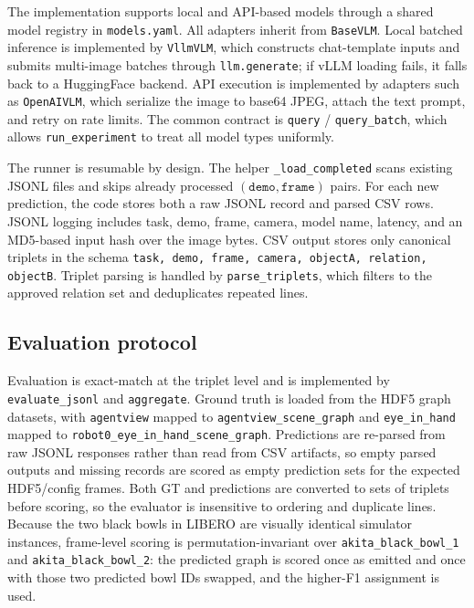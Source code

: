 \documentclass{article}
\begin{document}
The implementation supports local and API-based models through a shared model registry in \texttt{models.yaml}. All adapters inherit from \texttt{BaseVLM}. Local batched inference is implemented by \texttt{VllmVLM}, which constructs chat-template inputs and submits multi-image batches through \texttt{llm.generate}; if vLLM loading fails, it falls back to a HuggingFace backend. API execution is implemented by adapters such as \texttt{OpenAIVLM}, which serialize the image to base64 JPEG, attach the text prompt, and retry on rate limits. The common contract is \texttt{query} / \texttt{query\_batch}, which allows \texttt{run\_experiment} to treat all model types uniformly.

The runner is resumable by design. The helper \texttt{\_load\_completed} scans existing JSONL files and skips already processed $(\texttt{demo}, \texttt{frame})$ pairs. For each new prediction, the code stores both a raw JSONL record and parsed CSV rows. JSONL logging includes task, demo, frame, camera, model name, latency, and an MD5-based input hash over the image bytes. CSV output stores only canonical triplets in the schema \texttt{task, demo, frame, camera, objectA, relation, objectB}. Triplet parsing is handled by \texttt{parse\_triplets}, which filters to the approved relation set and deduplicates repeated lines.

\subsection{Evaluation protocol}
Evaluation is exact-match at the triplet level and is implemented by \texttt{evaluate\_jsonl} and \texttt{aggregate}. Ground truth is loaded from the HDF5 graph datasets, with \texttt{agentview} mapped to \texttt{agentview\_scene\_graph} and \texttt{eye\_in\_hand} mapped to \texttt{robot0\_eye\_in\_hand\_scene\_graph}. Predictions are re-parsed from raw JSONL responses rather than read from CSV artifacts, so empty parsed outputs and missing records are scored as empty prediction sets for the expected HDF5/config frames. Both GT and predictions are converted to sets of triplets before scoring, so the evaluator is insensitive to ordering and duplicate lines. Because the two black bowls in LIBERO are visually identical simulator instances, frame-level scoring is permutation-invariant over \texttt{akita\_black\_bowl\_1} and \texttt{akita\_black\_bowl\_2}: the predicted graph is scored once as emitted and once with those two predicted bowl IDs swapped, and the higher-F1 assignment is used.
\end{document}
